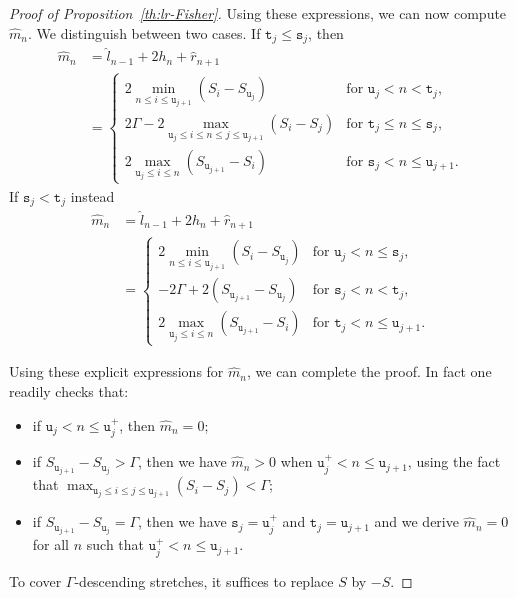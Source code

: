 \documentclass[AHL,Unicode,longabstracts,published]{cedram}
\newcommand{\gG}{\Gamma}
\renewcommand*\ss{\mathtt{u}}
\newcommand{\ttt}{\mathtt{t}}
\newcommand{\tu}{\ss}
\newcommand{\ts}{\mathtt{s}}
\newcommand{\ls}{\widehat{l}}
\newcommand{\rs}{\widehat{r}}
\newcommand{\ms}{\widehat{m}}
\begin{document}
\begin{proof}[Proof of Proposition~\ref{th:lr-Fisher}]
Using these expressions, we can now compute $\ms_n$. We distinguish between two cases. If $\ttt_j\le\ts_j$, then
\begin{equation}\label{eq:<case}
\begin{aligned}
\ms_n &= \ls_{n-1}+2h_n+\rs_{n+1}\\
 &=
\begin{cases}
2\min_{n\le i\le \tu_{j+1}} \left(S_i - S_{\tu_j}\right) & \text{for } \tu_j < n< \ttt_j, \\
2\gG - 2\max_{\tu_j\le i\le n \le j \le \tu_{j+1}} \left(S_i-S_j\right) & \text{for } \ttt_j \le n \le \ts_j, \\
2 \max_{\tu_j\le i\le n} \left(S_{\tu_{j+1}}-S_i \right) & \text{for } \ts_j < n \le \tu_{j+1}.
\end{cases}
\end{aligned}
\end{equation}
If $\ts_j<\ttt_j$ instead
\begin{equation}\label{eq:>case}
\begin{aligned}
\ms_n &= \ls_{n-1}+2h_n+\rs_{n+1}\\
&=
\begin{cases}
2\min_{n\le i\le \tu_{j+1}} \left(S_i - S_{\tu_j}\right) & \text{for } \tu_j < n \le \ts_j, \\
-2\gG + 2\left(S_{\tu_{j+1}}-S_{\tu_j}\right) & \text{for } \ts_j < n < \ttt_j, \\
2 \max_{\tu_j\le i\le n} \left(S_{\tu_{j+1}}-S_i \right) & \text{for } \ttt_j < n \le \tu_{j+1}.
\end{cases}
\end{aligned}
\end{equation}

Using these explicit expressions for $\ms_n$, we can complete the proof. In fact one readily checks that:
\begin{itemize}
\item if $\tu_j< n \le \tu_j^+$, then $\ms_n=0$;
\item if $S_{\tu_{j+1}}-S_{\tu_j}>\gG$, then we have $\ms_n>0$ when $\tu_j^+<n\le \tu_{j+1}$, using the fact that $\max_{\tu_j\le i \le j \le \tu_{j+1}} \left(S_i-S_j\right) < \gG$;
\item if $S_{\tu_{j+1}}-S_{\tu_j}=\gG$, then we have $\ts_j=\tu_j^+$ and $\ttt_j=\tu_{j +1}$ and we derive $\ms_n=0$ for all $n$ such that $\tu_j^+<n\le \tu_{j+1}$.
\end{itemize}

To cover $\gG$-descending stretches, it suffices to replace $S$ by $-S$.
\end{proof}
\end{document}
